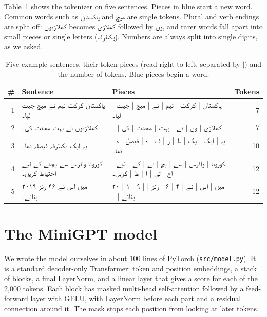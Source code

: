 \documentclass[11pt,a4paper]{article}
\newcommand{\ur}[1]{\texturdu{#1}}
\newcommand{\ws}[1]{\textcolor{wordstart}{#1}}
\begin{document}
Table~\ref{tab:tokdemo} shows the tokenizer on five sentences. Pieces in \ws{blue} start a new word. Common words such as \ur{پاکستان} and \ur{میچ} are single tokens. Plural and verb endings are split off: \ur{کھلاڑیوں} becomes \ur{کھلاڑی} followed by \ur{وں}, and rarer words fall apart into small pieces or single letters (\ur{یکطرفہ}). Numbers are always split into single digits, as we asked.

\begin{table}[H]
\centering
\small
\begin{tabular}{r >{\raggedleft\arraybackslash}p{} >{\raggedleft\arraybackslash}p{} r}
\toprule
\# & Sentence & Pieces & Tokens \\
\midrule
1 & \ur{پاکستان کرکٹ ٹیم نے میچ جیت لیا۔} & \ur{\ws{پاکستان} | \ws{کرکٹ} | \ws{ٹیم} | \ws{نے} | \ws{میچ} | \ws{جیت} | \ws{لیا۔}} & 7 \\
2 & \ur{کھلاڑیوں نے بہت محنت کی۔} & \ur{\ws{کھلاڑی} | وں | \ws{نے} | \ws{بہت} | \ws{محنت} | \ws{کی} | ۔} & 7 \\
3 & \ur{یہ ایک یکطرفہ فیصلہ تھا۔} & \ur{\ws{یہ} | \ws{ایک} | \ws{یک} | ط | ر | ف | ہ | \ws{فیصل} | ہ | \ws{تھا۔}} & 10 \\
4 & \ur{کورونا وائرس سے بچنے کے لیے احتیاط کریں۔} & \ur{\ws{کورونا} | \ws{وائرس} | \ws{سے} | \ws{بچ} | نے | \ws{کے} | \ws{لیے} | \ws{اح} | تی | ا | ط | \ws{کریں۔}} & 12 \\
5 & \ur{۲۰۱۹ میں اس نے ۴۶ رنز بنائے۔} & \ur{\ws{۲۰} | ۱ | ۹ | \ws{میں} | \ws{اس} | \ws{نے} | ۴ | ۶ | \ws{رنز} | \ws{بنائے} | ۔} & 12 \\
\bottomrule
\end{tabular}
\caption{Five example sentences, their token pieces (read right to left, separated by $|$) and the number of tokens. Blue pieces begin a word.}
\label{tab:tokdemo}
\end{table}

\section{The MiniGPT model}

We wrote the model ourselves in about 100 lines of PyTorch (\texttt{src/model.py}). It is a standard decoder-only Transformer: token and position embeddings, a stack of blocks, a final LayerNorm, and a linear layer that gives a score for each of the 2{,}000 tokens. Each block has masked multi-head self-attention followed by a feed-forward layer with GELU, with LayerNorm before each part and a residual connection around it. The mask stops each position from looking at later tokens.
\end{document}
